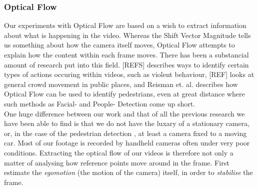 \subsubsection{Optical Flow}
%
%
Our experiments with Optical Flow are based on a wish to extract information about what is happening in the video. Whereas the Shift Vector Magnitude tells us something about how the camera itself moves, Optical Flow attempts to explain how the content within each frame moves. There has been a substancial amount of research put into this field. [REFS] describes ways to identify certain types of actions occuring within videos, such as violent behaviour, [REF] looks at general crowd movement in public places, and Reisman et. al. \cite{CrowdDetectionInVideoSequences} describes how Optical Flow can be used to identify pedestrians, even at great distance where such methods as Facial- and People- Detection come up short.\\
%
One huge difference between our work and that of all the previous research we have been able to find is that we do not have the luxary of a stationary camera, or, in the case of the pedestrian detection \cite{CrowdDetectionInVideoSequences}, at least a camera fixed to a moving car. Most of our footage is recorded by handheld cameras often under very poor conditions. Extracting the optical flow of our videos is therefore not only a matter of analysing how reference points move around in the frame. First estimate the \textit{egomotion} (the motion of the camera) itself, in order to \textit{stabilise} the frame.
%
